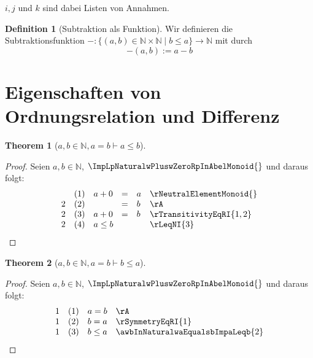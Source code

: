 \documentclass{book}
\theoremstyle{plain}
\newtheorem{theorem}{Theorem}
\theoremstyle{remark}
\theoremstyle{definition}
\newtheorem{definition}{Definition}[section]
\begin{document}
\(i, j\) und \(k\) sind dabei Listen von Annahmen.


\begin{definition}[Subtraktion als Funktion]
    Wir definieren die Subtraktionsfunktion \( - : \{ (a, b) \in \mathbb{N} \times \mathbb{N} \mid b \leq a \} \to \mathbb{N} \) mit
    durch
    \[
    -(a, b) := a-b
    \]
\end{definition}

\section{Eigenschaften von Ordnungsrelation und Differenz}

\label{awbInNaturalwaEqualsbImpaLeqb}
\begin{theorem}[\(a,b\in\mathbb{N},a=b\vdash a\leq b\)]
\end{theorem}
\begin{proof}
    Seien \(a,b\in\mathbb{N}\), \(\ImpLpNaturalwPluswZeroRpInAbelMonoid{}\) und daraus folgt:
        \[
	\begin{array}{lllcll}
                  &  (1) & a+0&=&a & \rNeutralElementMonoid{} \\
                2 &  (2) & &=&b & \rA \\
                2 &  (3) & a+0&=&b & \rTransitivityEqRI{1,2} \\
                2 &  (4) & \multicolumn{3}{l}{a\leq b} & \rLeqNI{3} \\
    \end{array}
	\]
\end{proof}

\label{awbInNaturalwaEqualsbImpbLeqa}
\begin{theorem}[\(a,b\in\mathbb{N},a=b\vdash b\leq a\)]
\end{theorem}
\begin{proof}
    Seien \(a,b\in\mathbb{N}\), \(\ImpLpNaturalwPluswZeroRpInAbelMonoid{}\) und daraus folgt:
        \[
	\begin{array}{lllcll}
                1 &  (1) & \multicolumn{3}{l}{a=b} & \rA \\
                1 &  (2) & \multicolumn{3}{l}{b=a} & \rSymmetryEqRI{1} \\
                1 &  (3) & \multicolumn{3}{l}{b\leq a}& \awbInNaturalwaEqualsbImpaLeqb{2} \\
    \end{array}
	\]
\end{proof}
\end{document}

